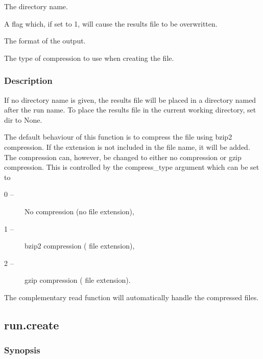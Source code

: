   The directory name.

  A flag which, if set to 1, will cause the results file to be overwritten.

  The format of the output.

  The type of compression  to use when creating the file.

\subsubsection{Description}

If no directory name is given, the results file will be placed in a directory named after
the run name.  To place the results file in the current working directory, set dir to None.

The default behaviour of this function is to compress the file using bzip2  compression.   If
the extension 
 is not included in the file name, it will be added.  The compression 
can, however, be changed to either no compression  or gzip  compression.   This is controlled
by the compress\_type argument which can be set to

\begin{description}
\item[    0 --]   No compression  (no file extension),
\item[    1 --]   bzip2  compression  (
 file extension),
\item[    2 --]   gzip  compression  (
 file extension).
\end{description}

The complementary read  function will automatically handle the compressed files.


\newpage

\subsection{run.create}


\subsubsection{Synopsis}

